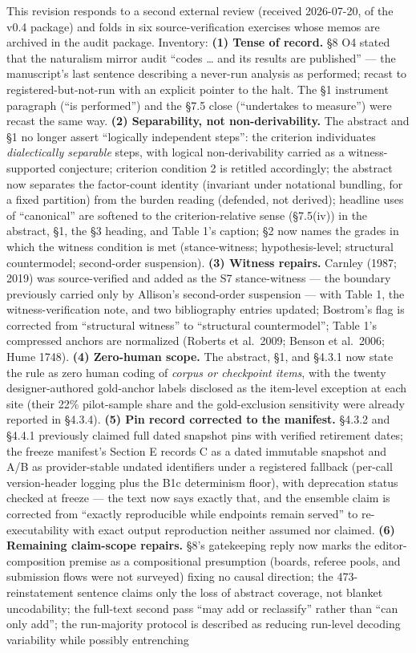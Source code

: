 This revision responds to a second external review (received 2026-07-20, of the v0.4 package) and folds in six source-verification exercises whose memos are archived in the audit package. Inventory: \textbf{(1) Tense of record.} \S{}8 O4 stated that the naturalism mirror audit ``codes \ldots{} and its results are published'' --- the manuscript's last sentence describing a never-run analysis as performed; recast to registered-but-not-run with an explicit pointer to the halt. The \S{}1 instrument paragraph (``is performed'') and the \S{}7.5 close (``undertakes to measure'') were recast the same way. \textbf{(2) Separability, not non-derivability.} The abstract and \S{}1 no longer assert ``logically independent steps'': the criterion individuates \emph{dialectically separable} steps, with logical non-derivability carried as a witness-supported conjecture; criterion condition 2 is retitled accordingly; the abstract now separates the factor-count identity (invariant under notational bundling, for a fixed partition) from the burden reading (defended, not derived); headline uses of ``canonical'' are softened to the criterion-relative sense (\S{}7.5(iv)) in the abstract, \S{}1, the \S{}3 heading, and Table 1's caption; \S{}2 now names the grades in which the witness condition is met (stance-witness; hypothesis-level; structural countermodel; second-order suspension). \textbf{(3) Witness repairs.} Carnley (1987; 2019) was source-verified and added as the S7 stance-witness --- the boundary previously carried only by Allison's second-order suspension --- with Table 1, the witness-verification note, and two bibliography entries updated; Bostrom's flag is corrected from ``structural witness'' to ``structural countermodel''; Table 1's compressed anchors are normalized (Roberts et al.~2009; Benson et al.~2006; Hume 1748). \textbf{(4) Zero-human scope.} The abstract, \S{}1, and \S{}4.3.1 now state the rule as zero human coding of \emph{corpus or checkpoint items}, with the twenty designer-authored gold-anchor labels disclosed as the item-level exception at each site (their 22\% pilot-sample share and the gold-exclusion sensitivity were already reported in \S{}4.3.4). \textbf{(5) Pin record corrected to the manifest.} \S{}4.3.2 and \S{}4.4.1 previously claimed full dated snapshot pins with verified retirement dates; the freeze manifest's Section E records C as a dated immutable snapshot and A/B as provider-stable undated identifiers under a registered fallback (per-call version-header logging plus the B1c determinism floor), with deprecation status checked at freeze --- the text now says exactly that, and the ensemble claim is corrected from ``exactly reproducible while endpoints remain served'' to re-executability with exact output reproduction neither assumed nor claimed. \textbf{(6) Remaining claim-scope repairs.} \S{}8's gatekeeping reply now marks the editor-composition premise as a compositional presumption (boards, referee pools, and submission flows were not surveyed) fixing no causal direction; the 473-reinstatement sentence claims only the loss of abstract coverage, not blanket uncodability; the full-text second pass ``may add or reclassify'' rather than ``can only add''; the run-majority protocol is described as reducing run-level decoding variability while possibly entrenching 